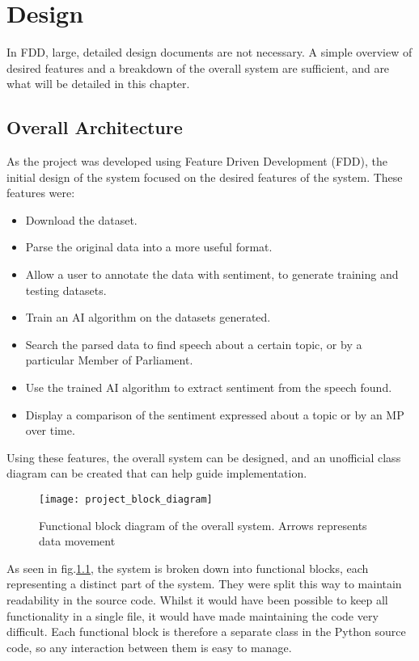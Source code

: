 \chapter{Design}

In FDD, large, detailed design documents are not necessary. A simple overview of desired features and a breakdown of the overall system are sufficient, and are what will be detailed in this chapter.

\section{Overall Architecture}
As the project was developed using Feature Driven Development (FDD), the initial design of the system focused on the desired features of the system. These features were:
\begin{itemize}
	\item Download the dataset.
	\item Parse the original data into a more useful format.
	\item Allow a user to annotate the data with sentiment, to generate training and testing datasets.
	\item Train an AI algorithm on the datasets generated.
	\item Search the parsed data to find speech about a certain topic, or by a particular Member of Parliament.
	\item Use the trained AI algorithm to extract sentiment from the speech found.
	\item Display a comparison of the sentiment expressed about a topic or by an MP over time.
\end{itemize}

Using these features, the overall system can be designed, and an unofficial class diagram can be created that can help guide implementation.

\begin{figure}[ht]
	\texttt{[image: project\_block\_diagram]}
	\caption{Functional block diagram of the overall system. Arrows represents data movement}
	\label{fig:project_block_diagram}
\end{figure}

As seen in fig.\ref{fig:project_block_diagram}, the system is broken down into functional blocks, each representing a distinct part of the system. They were split this way to maintain readability in the source code. Whilst it would have been possible to keep all functionality in a single file, it would have made maintaining the code very difficult. Each functional block is therefore a separate class in the Python source code, so any interaction between them is easy to manage.

